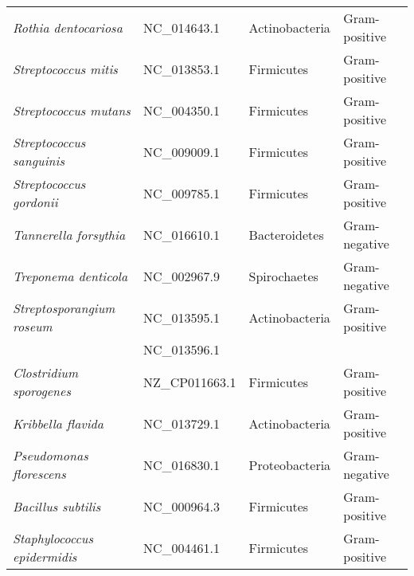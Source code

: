 \documentclass[12pt, a4paper]{article}
\begin{document}
{\begin{appendices}
\begin{table}[!ht]
\begin{tabular}{C{5cm} C{3.75cm} C{2.75cm} C{2.75cm} }
  	\textit{Rothia dentocariosa} & NC\_014643.1 & Actinobacteria & Gram-positive \\ 
  	\textit{Streptococcus mitis} & NC\_013853.1 & Firmicutes & Gram-positive \\ 
  	\textit{Streptococcus mutans} & NC\_004350.1 & Firmicutes & Gram-positive \\ 
  	\textit{Streptococcus sanguinis} & NC\_009009.1 & Firmicutes & Gram-positive \\ 
  	\textit{Streptococcus gordonii} & NC\_009785.1 & Firmicutes & Gram-positive \\ 
  	\textit{Tannerella forsythia} & NC\_016610.1 & Bacteroidetes & Gram-negative \\ 
  	\textit{Treponema denticola} & NC\_002967.9 & Spirochaetes & Gram-negative \\ 
  	\textit{Streptosporangium roseum} & NC\_013595.1 & Actinobacteria & Gram-positive \\ 
  	 & NC\_013596.1 & & \\
  	\textit{Clostridium sporogenes} & NZ\_CP011663.1 & Firmicutes & Gram-positive \\ 
  	\textit{Kribbella flavida} & NC\_013729.1 & Actinobacteria & Gram-positive \\ 
  	\textit{Pseudomonas florescens} & NC\_016830.1 & Proteobacteria & Gram-negative \\ 
  	\textit{Bacillus subtilis} & NC\_000964.3 & Firmicutes & Gram-positive \\ 
  	\textit{Staphylococcus epidermidis} & NC\_004461.1 & Firmicutes & Gram-positive \\ 
   \bottomrule
\end{tabular}
\end{table}
\clearpage


\end{appendices}}
\end{document}
